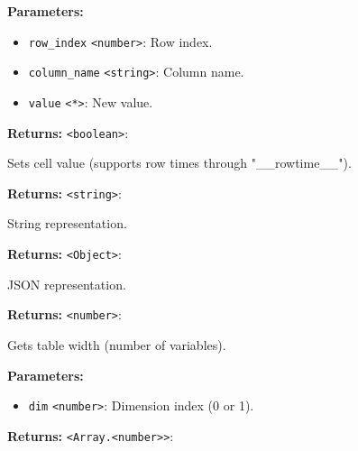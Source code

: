 \documentclass[12pt,a4paper]{article}
\begin{document}
\noindent \textbf{Parameters:}
\begin{itemize}
  \item \texttt{row\_index} \texttt{<number>}: Row index.
  \item \texttt{column\_name} \texttt{<string>}: Column name.
  \item \texttt{value} \texttt{<*>}: New value.
\end{itemize}

\noindent \textbf{Returns:} \texttt{<boolean>}:

\noindent Sets cell value (supports row times through "\_\_rowtime\_\_").

\vspace{5mm}
\noindent {}


\noindent \textbf{Returns:} \texttt{<string>}:

\noindent String representation.

\vspace{5mm}
\noindent {}


\noindent \textbf{Returns:} \texttt{<Object>}:

\noindent JSON representation.

\vspace{5mm}
\noindent {}


\noindent \textbf{Returns:} \texttt{<number>}:

\noindent Gets table width (number of variables).

\vspace{5mm}
\noindent {}


\noindent \textbf{Parameters:}
\begin{itemize}
  \item \texttt{dim} \texttt{<number>}: Dimension index (0 or 1).
\end{itemize}

\noindent \textbf{Returns:} \texttt{<Array.<number>>}:
\end{document}
